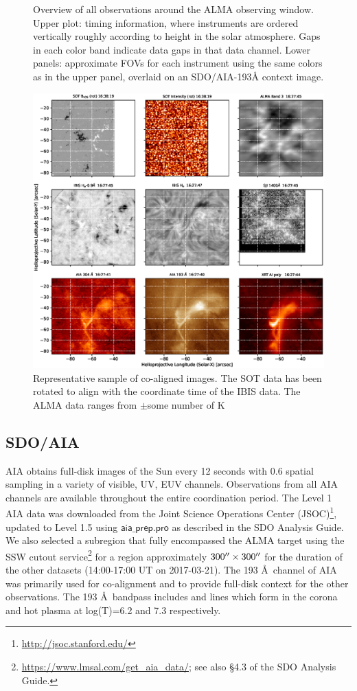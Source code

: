 \documentclass[twocolumn]{aastex62}
\newcommand{\code}[1]{\ensuremath{\textsf{#1}}}
\newcommand{\fnc}[1]{\code{#1}}
\begin{document}
\begin{figure}
    \caption{Overview of all observations around the ALMA observing window.  Upper plot: timing information, where instruments are ordered vertically roughly according to height in the solar atmosphere.  Gaps in each color band indicate data gaps in that data channel.  Lower panels: approximate FOVs for each instrument using the same colors as in the upper panel, overlaid on an SDO/AIA-193\AA{} context image.}
    \label{fig:coordination}
\end{figure}
\begin{figure}
    \centering
    \includegraphics[width=0.95\linewidth]{figures/IBISimg0108.eps}
    \caption{Representative sample of co-aligned images. The SOT data has been rotated to align with the coordinate time of the IBIS data. The ALMA data ranges from $\pm$some number of K}
    \label{fig:coordination}
\end{figure}

\subsection{SDO/AIA}\label{sec:sdoaia}
AIA obtains full-disk images of the Sun every 12 seconds with 0.6\arcsec{} spatial sampling in a variety of visible, UV, EUV channels.
Observations from all AIA channels are available throughout the entire coordination period.
The Level 1 AIA data was downloaded from the Joint Science Operations Center (JSOC)\footnote{\url{http://jsoc.stanford.edu/}}, updated to Level 1.5 using \fnc{aia\_prep.pro} as described in the SDO Analysis Guide.
We also selected a subregion that fully encompassed the ALMA target using the SSW cutout service\footnote{\url{https://www.lmsal.com/get_aia_data/}; see also \S4.3 of the SDO Analysis Guide.} for a region approximately $300\mbox{$^{\prime\prime}$}\times300\mbox{$^{\prime\prime}$}$ for the duration of the other datasets (14:00-17:00 UT on 2017-03-21).
The 193 \AA\ channel of AIA was primarily used for co-alignment and to provide full-disk context for the other observations.  
The 193 \AA\ bandpass includes  and  lines which form in the corona and hot plasma at log(T)=6.2 and 7.3 respectively.  
\end{document}
